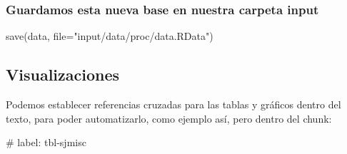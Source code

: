 \documentclass[
  letterpaper,
  DIV=11,
  numbers=noendperiod]{scrartcl}
\newenvironment{Shaded}{\begin{snugshade}}{\end{snugshade}}
\newcommand{\AttributeTok}[1]{\textcolor[rgb]{0.40,0.45,0.13}{#1}}
\newcommand{\ConstantTok}[1]{\textcolor[rgb]{0.56,0.35,0.01}{#1}}
\newcommand{\DecValTok}[1]{\textcolor[rgb]{0.68,0.00,0.00}{#1}}
\newcommand{\FunctionTok}[1]{\textcolor[rgb]{0.28,0.35,0.67}{#1}}
\newcommand{\NormalTok}[1]{\textcolor[rgb]{0.00,0.23,0.31}{#1}}
\newcommand{\OtherTok}[1]{\textcolor[rgb]{0.00,0.23,0.31}{#1}}
\newcommand{\SpecialCharTok}[1]{\textcolor[rgb]{0.37,0.37,0.37}{#1}}
\newcommand{\StringTok}[1]{\textcolor[rgb]{0.13,0.47,0.30}{#1}}
\begin{document}
\begin{Shaded}
\end{Shaded}

\subsubsection{Guardamos esta nueva base en nuestra carpeta
input}\label{guardamos-esta-nueva-base-en-nuestra-carpeta-input}

\begin{Shaded}
\begin{Highlighting}[]
\FunctionTok{save}\NormalTok{(data, }\AttributeTok{file=}\StringTok{"input/data/proc/data.RData"}\NormalTok{)}
\end{Highlighting}
\end{Shaded}

\subsection{Visualizaciones}\label{visualizaciones}

Podemos establecer referencias cruzadas para las tablas y gráficos
dentro del texto, para poder automatizarlo, como ejemplo así, pero
dentro del chunk:

\#\textbar{} label: tbl-sjmisc
\end{document}
